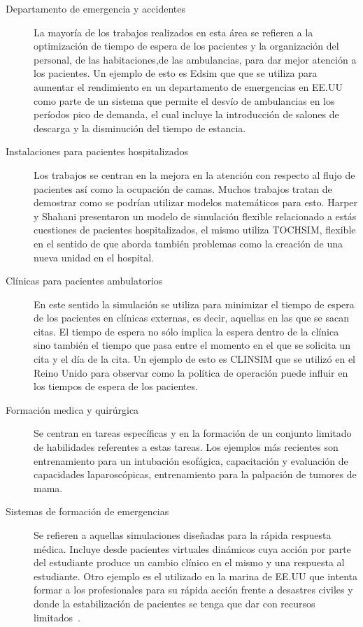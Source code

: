 \begin{description}

\item[Departamento de emergencia y accidentes] La mayoría de los trabajos
	realizados en esta área se refieren a la optimización de tiempo de
	espera de los pacientes y la organización del personal, de las
	habitaciones,de las ambulancias, para dar mejor atención a los
	pacientes. Un ejemplo de esto es Edsim que que se utiliza para aumentar
	el rendimiento en un departamento de emergencias en EE.UU como parte de
	un sistema que permite el desvío de ambulancias en los períodos pico de
	demanda, el cual incluye la introducción de salones de descarga y la
	disminución del tiempo de estancia\cite{guna:simulation}. 
	
\item[Instalaciones para pacientes hospitalizados] Los trabajos se centran en la
	mejora en la atención con respecto al flujo de pacientes así como la
	ocupación de camas. Muchos trabajos tratan de demostrar como se podrían
	utilizar modelos matemáticos para esto. Harper y Shahani presentaron un
	modelo de simulación flexible relacionado a estás cuestiones de
	pacientes hospitalizados, el mismo utiliza TOCHSIM, flexible en el
	sentido de que aborda también problemas como la creación de una nueva
	unidad en el hospital\cite{guna:simulation}.

\item[Clínicas para pacientes ambulatorios] En este sentido la simulación se
	utiliza para minimizar el tiempo de espera de los pacientes en clínicas
	externas, es decir, aquellas en las que se sacan citas. El tiempo de
	espera no sólo implica la espera dentro de la clínica sino también el
	tiempo que pasa entre el momento en el que se solicita un cita y el día
	de la cita. Un ejemplo de esto es CLINSIM que se utilizó en el Reino
	Unido para observar como la política de operación puede influir en los
	tiempos de espera de los pacientes\cite{guna:simulation}. 

\item[Formación medica y quirúrgica] Se centran en tareas específicas y en la
	formación de un conjunto limitado de habilidades referentes a estas
	tareas. Los ejemplos más recientes son entrenamiento para un intubación
	esofágica, capacitación y evaluación de capacidades laparoscópicas,
	entrenamiento para la palpación de tumores de mama\cite{mantovani:vr}. 

\item[Sistemas de formación de emergencias] Se refieren a aquellas simulaciones
	diseñadas para la rápida respuesta médica. Incluye desde pacientes
	virtuales dinámicos cuya acción por parte del estudiante produce un
	cambio clínico en el mismo y una respuesta al estudiante.  Otro ejemplo
	es el utilizado en la marina de EE.UU que intenta formar a los
	profesionales para su rápida acción frente a desastres civiles y donde
	la estabilización de pacientes se tenga que dar con recursos
	limitados~\cite{mantovani:vr}. 


\end{description}
